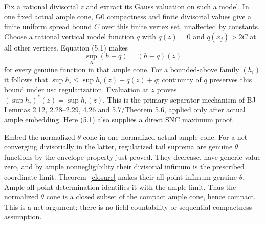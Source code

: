 \documentclass[10pt]{article}
\begin{document}
Fix a rational divisorial $z$ and extract its Gauss valuation on such a model.
In one fixed actual ample cone, G0 compactness and finite divisorial values
give a finite uniform spread bound $C$ over this finite vertex set, unaffected
by constants. Choose a rational vertical model function $q$ with $q(z)=0$
and $q(x_j)>2C$ at all other vertices. Equation (5.1) makes
\[
 \sup_K(h-q)=(h-q)(z)                              \tag{5.2}
\]
for every genuine function in that ample cone. For a bounded-above family
$(h_i)$ it follows that $\sup h_i\leq\sup h_i(z)-q(z)+q$; continuity of $q$
preserves this bound under usc regularization. Evaluation at $z$ proves
$(\sup h_i)^*(z)=\sup h_i(z)$. This is the primary separator mechanism of
BJ Lemmas 2.12, 2.28--2.29, 4.26 and 5.7/Theorem 5.6, applied only after
actual ample embedding. Here (5.1) also supplies a direct SNC maximum proof.

Embed the normalized $\theta$ cone in one normalized actual ample cone.
For a net converging divisorially in the latter, regularized tail suprema are
genuine $\theta$ functions by the envelope property just proved. They decrease,
have generic value zero, and by ample nonnegligibility their divisorial infimum
is the prescribed coordinate limit. Theorem~\ref{closure} makes their
all-point infimum genuine $\theta$. Ample all-point determination identifies
it with the ample limit. Thus the normalized $\theta$ cone is a closed
subset of the compact ample cone, hence compact. This is a net argument;
there is no field-countability or sequential-compactness assumption.
\end{document}
